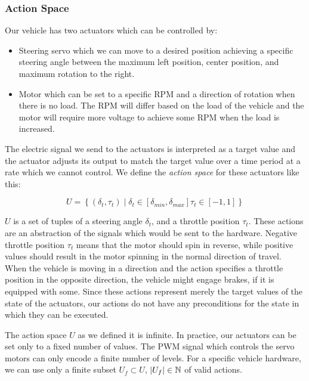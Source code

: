 \subsubsection{Action Space}

Our vehicle has two actuators which can be controlled by:
\begin{itemize}
	\item Steering servo which we can move to a desired position achieving a specific steering angle between the maximum left position, center position, and maximum rotation to the right.
	
	\item Motor which can be set to a specific \gls{RPM} and a direction of rotation when there is no load. The \gls*{RPM} will differ based on the load of the vehicle and the motor will require more voltage to achieve some RPM when the load is increased.
\end{itemize}

The electric signal we send to the actuators is interpreted as a target value and the actuator adjusts its output to match the target value over a time period at a rate which we cannot control. We define the \textit{action space} for these actuators like this:

\[
	U=\left\{ \left( \delta_t,\tau_t\right) \mid \delta_t\in\left[\delta_{min},\delta_{max}\right] \tau_t\in\left[-1, 1\right] \right\}
\]

$U$ is a set of tuples of a steering angle $\delta_t$, and a throttle position $\tau_t$. These actions are an abstraction of the signals which would be sent to the hardware. Negative throttle position $\tau_t$ means that the motor should spin in reverse, while positive values should result in the motor spinning in the normal direction of travel. When the vehicle is moving in a direction and the action specifies a throttle position in the opposite direction, the vehicle might engage brakes, if it is equipped with some. Since these actions represent merely the target values of the state of the actuators, our actions do not have any preconditions for the state in which they can be executed.

The action space $U$ as we defined it is infinite. In practice, our actuators can be set only to a fixed number of values. The \gls*{PWM} signal which controls the servo motors can only encode a finite number of levels. For a specific vehicle hardware, we can use only a finite subset $U_f\subset U$, $\left|{U_f}\right|\in\mathbb{N}$ of valid actions.

